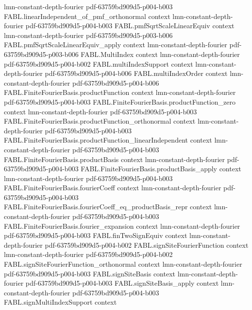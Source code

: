 \begin{theorem}[Parseval]
  {lmn-constant-depth-fourier}
  {pdf-63759bd909d5-p004-b003}
\proofstep
  {FABL.linearIndependent_of_pmf_orthonormal}
  {context}
  {lmn-constant-depth-fourier}
  {pdf-63759bd909d5-p004-b003}
\proofstep
  {FABL.pmfSqrtScaleLinearEquiv}
  {context}
  {lmn-constant-depth-fourier}
  {pdf-63759bd909d5-p003-b006}
\proofstep
  {FABL.pmfSqrtScaleLinearEquiv_apply}
  {context}
  {lmn-constant-depth-fourier}
  {pdf-63759bd909d5-p003-b006}
\proofstep
  {FABL.MultiIndex}
  {context}
  {lmn-constant-depth-fourier}
  {pdf-63759bd909d5-p004-b002}
\proofstep
  {FABL.multiIndexSupport}
  {context}
  {lmn-constant-depth-fourier}
  {pdf-63759bd909d5-p004-b006}
\proofstep
  {FABL.multiIndexOrder}
  {context}
  {lmn-constant-depth-fourier}
  {pdf-63759bd909d5-p004-b006}
\proofstep
  {FABL.FiniteFourierBasis.productFunction}
  {context}
  {lmn-constant-depth-fourier}
  {pdf-63759bd909d5-p004-b003}
\proofstep
  {FABL.FiniteFourierBasis.productFunction_zero}
  {context}
  {lmn-constant-depth-fourier}
  {pdf-63759bd909d5-p004-b003}
\proofstep
  {FABL.FiniteFourierBasis.productFunction_orthonormal}
  {context}
  {lmn-constant-depth-fourier}
  {pdf-63759bd909d5-p004-b003}
\proofstep
  {FABL.FiniteFourierBasis.productFunction_linearIndependent}
  {context}
  {lmn-constant-depth-fourier}
  {pdf-63759bd909d5-p004-b003}
\proofstep
  {FABL.FiniteFourierBasis.productBasis}
  {context}
  {lmn-constant-depth-fourier}
  {pdf-63759bd909d5-p004-b003}
\proofstep
  {FABL.FiniteFourierBasis.productBasis_apply}
  {context}
  {lmn-constant-depth-fourier}
  {pdf-63759bd909d5-p004-b003}
\proofstep
  {FABL.FiniteFourierBasis.fourierCoeff}
  {context}
  {lmn-constant-depth-fourier}
  {pdf-63759bd909d5-p004-b003}
\proofstep
  {FABL.FiniteFourierBasis.fourierCoeff_eq_productBasis_repr}
  {context}
  {lmn-constant-depth-fourier}
  {pdf-63759bd909d5-p004-b003}
\proofstep
  {FABL.FiniteFourierBasis.fourier_expansion}
  {context}
  {lmn-constant-depth-fourier}
  {pdf-63759bd909d5-p004-b003}
\proofstep
  {FABL.finTwoSignEquiv}
  {context}
  {lmn-constant-depth-fourier}
  {pdf-63759bd909d5-p004-b002}
\proofstep
  {FABL.signSiteFourierFunction}
  {context}
  {lmn-constant-depth-fourier}
  {pdf-63759bd909d5-p004-b002}
\proofstep
  {FABL.signSiteFourierFunction_orthonormal}
  {context}
  {lmn-constant-depth-fourier}
  {pdf-63759bd909d5-p004-b003}
\proofstep
  {FABL.signSiteBasis}
  {context}
  {lmn-constant-depth-fourier}
  {pdf-63759bd909d5-p004-b003}
\proofstep
  {FABL.signSiteBasis_apply}
  {context}
  {lmn-constant-depth-fourier}
  {pdf-63759bd909d5-p004-b003}
\proofstep
  {FABL.signMultiIndexSupport}
  {context}

\end{theorem}
